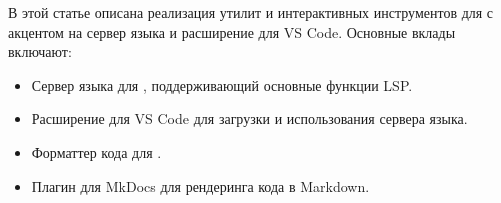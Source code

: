 В этой статье описана реализация утилит и интерактивных инструментов для \Rzk{} с акцентом на сервер языка и расширение для VS Code. Основные вклады включают:
\begin{itemize}
  \item Сервер языка для \Rzk{}, поддерживающий основные функции LSP.
  \item Расширение для VS Code для загрузки и использования сервера языка.
  \item Форматтер кода для \Rzk{}.
  \item Плагин для MkDocs для рендеринга кода \Rzk{} в Markdown.
\end{itemize}

